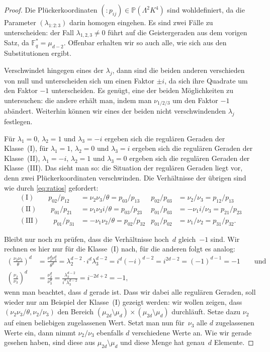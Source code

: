 \begin{proof}
Die Plückerkoordinaten $(:\!p_{ij}) \in \mathbb P(\Lambda^2 K^4)$ sind wohldefiniert, da die Parameter $(\lambda_{1:2:3})$ darin homogen eingehen. Es sind zwei Fälle zu unterscheiden: der Fall $\lambda_{1,2,3} \neq 0$ führt auf die Geistergeraden aus dem vorigen Satz, da $\mathbb F_q^* = \mu_{d-2}$. Offenbar erhalten wir so auch alle, wie sich aus den Substitutionen ergibt.

Verschwindet hingegen eines der $\lambda_j$, dann sind die beiden anderen verschieden von null und unterscheiden sich um einen Faktor $\pm i$, da sich ihre Quadrate um den Faktor $-1$ unterscheiden. Es genügt, eine der beiden Möglichkeiten zu untersuchen: die andere erhält man, indem man $\nu_{1/2/3}$ um den Faktor $-1$ abändert. Weiterhin können wir eines der beiden nicht verschwindenden $\lambda_j$ festlegen.

Für $\lambda_1 = 0$, $\lambda_2 = 1$ und $\lambda_3 = -i$ ergeben sich die regulären Geraden der Klasse~(I), für $\lambda_1 = 1$, $\lambda_2 = 0$ und $\lambda_3 = i$ ergeben sich die regulären Geraden der Klasse~(II), $\lambda_1 = -i$, $\lambda_2 = 1$ und $\lambda_3 = 0$ ergeben sich die regulären Geraden der Klasse~(III). Das sieht man so: die Situation der regulären Geraden liegt vor, denn zwei Plückerkoordinaten verschwinden. Die Verhältnisse der übrigen sind wie durch \eqref{eq:ratios} gefordert:
\begin{align*}
\mathrm{(I)}\qquad p_{02}/p_{12} &= \nu_2 \nu_3 / \theta = p_{03}/p_{13} &p_{02}/p_{03} &= \nu_2/\nu_3 = p_{12}/p_{13} \\
\mathrm{(II)}\qquad p_{01}/p_{21} &= \nu_1 \nu_3 i/ \theta = p_{03}/p_{23} &p_{01}/p_{03} &= -\nu_1 i/\nu_3 = p_{21}/p_{23} \\
\mathrm{(III)}\qquad p_{01}/p_{31} &= -\nu_1 \nu_2/\theta = p_{02}/p_{32} &p_{01}/p_{02} &= \nu_1/\nu_2 = p_{31}/p_{32}.
\end{align*}

Bleibt nur noch zu prüfen, dass die Verhältnisse hoch~$d$ gleich~$-1$ sind. Wir rechnen es hier nur für die Klasse~(I) nach, für die anderen folgt es analog:
\begin{align*}
\left( \frac{\nu_2 \nu_3}{\theta} \right)^d &= \frac{\nu_2^d \nu_3^d}{\theta^d} = \lambda_2^{d-2} \cdot i^d \lambda_3^{d-2} = i^d (-i)^{d-2} = i^{2d-2} = (-1)^{d-1} = -1\qquad\text{und} \\
\left( \frac{\nu_2}{\nu_3} \right)^d &= \frac{\nu_2^d}{\nu_3^d} = \frac{\lambda_2^{d-2}}{i^d \lambda_3^{d-2}} = i^{-2d+2} = -1,
\end{align*}
wenn man beachtet, dass $d$ gerade ist. Dass wir dabei alle regulären Geraden, soll wieder nur am Beispiel der Klasse~(I) gezeigt werden: wir wollen zeigen, dass $(\nu_2 \nu_3 / \theta, \nu_2 / \nu_3)$ den Bereich $(\mu_{2d} \setminus \mu_d) \times (\mu_{2d} \setminus \mu_d)$ durchläuft. Setze dazu $\nu_2$ auf einen beliebigen zugelassenen Wert. Setzt man nun für~$\nu_3$ alle $d$ zugelassenen Werte ein, dann nimmt $\nu_2 / \nu_3$ ebenfalls $d$ verschiedene Werte an. Wie wir gerade gesehen haben, sind diese aus $\mu_{2d} \setminus \mu_d$ und diese Menge hat genau~$d$ Elemente.


\end{proof}
